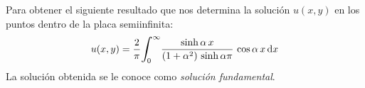 Para obtener el siguiente resultado que nos determina la solución $u(x,y)$ en los puntos dentro de la placa semiinfinita:
\begin{align*}
u(x, y) = \dfrac{2}{\pi} \scaleint{6ex}_{\bs 0}^{\infty} \dfrac{\sinh \alpha \, x}{(1 + \alpha^{2}) \, \sinh \alpha \pi} \, \cos \alpha \, x \dd{x}
\end{align*}
La solución obtenida se le conoce como \emph{solución fundamental}.


